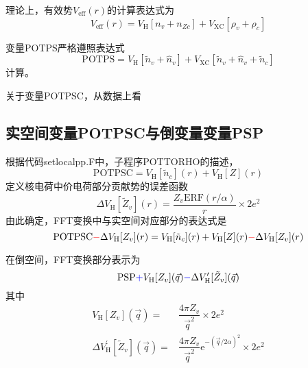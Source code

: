 \documentclass[10pt, oneside, a4paper]{article}      %
\begin{document}
理论上，有效势$V_{\mathrm{eff}}(r)$的计算表达式为
\begin{equation}
	V_{\mathrm{eff}}(r) = V_{\mathrm{H}}[n_v+n_{Zc}]+V_{\mathrm{XC}}[\rho_v+\rho_c]
	\label{eq:POT_EFF}
\end{equation}

变量\textrm{POTPS}严格遵照表达式
\begin{equation}
	\mathrm{POTPS} = V_{\mathrm{H}}[\tilde{n}_v+\hat{n}_v]+V_{\mathrm{XC}}[\tilde{n}_v+\hat{n}_v+\tilde{n}_c]
	\label{eq:POTPS}
\end{equation}
计算。

关于变量\textrm{POTPSC}，从数据上看

\subsection{实空间变量\textrm{POTPSC}与倒变量变量\textrm{PSP}}
根据代码\textrm{setlocalpp.F}中，子程序\textrm{POTTORHO}的描述，
\begin{equation}
		\mathrm{POTPSC} = V_{\mathrm{H}}[\tilde{n}_c](r)+V_{\mathrm{H}}[Z](r)
	\label{eq:POTPSC}
\end{equation}
定义核电荷中价电荷部分贡献势的误差函数
\begin{equation}
	\Delta V_{\mathrm{H}}[\tilde{Z}_v](r)=\dfrac{Z_v\mathrm{ERF}(r/\alpha)}r\times2e^2
	\label{eq:Delta_Z_valence}
\end{equation}
由此确定，\textrm{FFT}变换中与实空间对应部分的表达式是
\begin{displaymath}
	\mathrm{POTPSC} \textcolor{red}{-} \Delta V_{\mathrm{H}}[Z_v](r) = V_{\mathrm{H}}[\tilde{n}_c](r)+V_{\mathrm{H}}[Z](r) \textcolor{red}{-} \Delta V_{\mathrm{H}}[Z_v](r)
\end{displaymath}

在倒空间，\textrm{FFT}变换部分表示为
\begin{displaymath}
	\mathrm{PSP} \textcolor{blue}{+} V_{\mathrm{H}}[Z_v](\vec{q}) \textcolor{blue}{-} \Delta V_{\mathrm{H}}^{\prime}[\tilde{Z}_v](\vec q)
\end{displaymath}
其中
\begin{displaymath}
	\begin{aligned}
		V_{\mathrm{H}}[Z_v](\vec q)=&\dfrac{4\pi Z_v}{\vec q^2}\times2e^2\\
		\Delta V_{\mathrm{H}}^{\prime}[\tilde{Z}_v](\vec q)=&\dfrac{4\pi Z_v}{\vec q^2}\mathrm{e}^{-(\vec q/2\alpha)^2}\times2e^2
	\end{aligned}
\end{displaymath}
\end{document}
